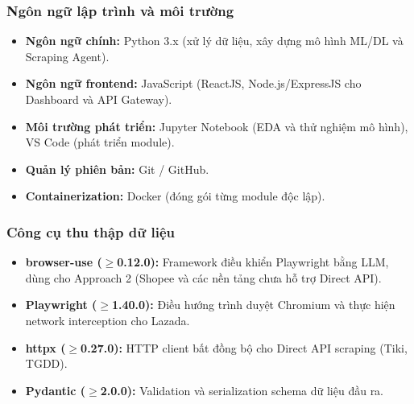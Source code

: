 \subsubsection{Ngôn ngữ lập trình và môi trường}
\begin{itemize}
    \item \textbf{Ngôn ngữ chính:} Python 3.x (xử lý dữ liệu, xây dựng mô hình ML/DL và Scraping Agent).
    \item \textbf{Ngôn ngữ frontend:} JavaScript (ReactJS, Node.js/ExpressJS cho Dashboard và API Gateway).
    \item \textbf{Môi trường phát triển:} Jupyter Notebook (EDA và thử nghiệm mô hình), VS Code (phát triển module).
    \item \textbf{Quản lý phiên bản:} Git / GitHub.
    \item \textbf{Containerization:} Docker (đóng gói từng module độc lập).
\end{itemize}

\subsubsection{Công cụ thu thập dữ liệu}
\begin{itemize}[labelsep=10pt, leftmargin=2cm]
    \item \textbf{browser-use ($\geq$0.12.0):} Framework điều khiển Playwright bằng LLM, dùng cho Approach 2 (Shopee và các nền tảng chưa hỗ trợ Direct API).
    \item \textbf{Playwright ($\geq$1.40.0):} Điều hướng trình duyệt Chromium và thực hiện network interception cho Lazada.
    \item \textbf{httpx ($\geq$0.27.0):} HTTP client bất đồng bộ cho Direct API scraping (Tiki, TGDD).
    \item \textbf{Pydantic ($\geq$2.0.0):} Validation và serialization schema dữ liệu đầu ra.
\end{itemize}


